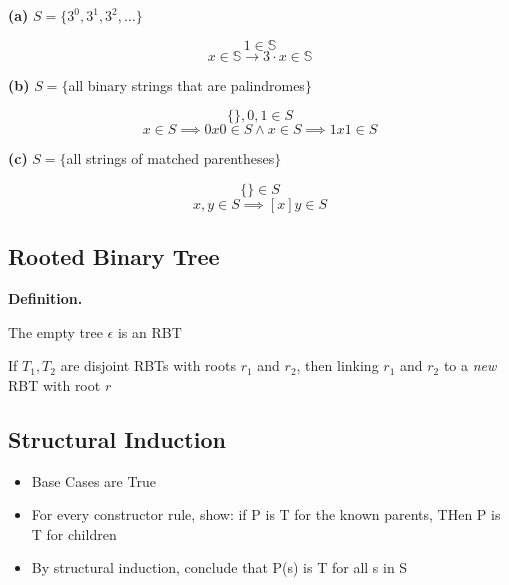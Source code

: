 \documentclass{article}
\begin{document}
\textbf{(a) } $S = \{3^0, 3^1, 3^2, \dots\}$

$$1 \in \mathbb{S}$$
$$x \in \mathbb{S} \rightarrow 3\cdot x \in \mathbb{S}$$

\textbf{(b) } $S = \{$all binary strings that are palindromes$\}$

$$\{\},0,1 \in S$$
$$x \in S \implies 0x0 \in S \wedge x \in S \implies 1x1 \in S$$

\textbf{(c) } $S = \{$all strings of matched parentheses$\}$ 

$$\{\} \in S$$ $$x,y \in S \implies [x]y \in S$$

\subsection*{Rooted Binary Tree}

\textbf{Definition.}

The empty tree $\epsilon$ is an RBT

If $T_1, T_2$ are disjoint RBTs with roots $r_1$ and $r_2$, then linking $r_1$ and $r_2$ to a \textit{new} RBT with root $r$

\subsection*{Structural Induction}

\begin{itemize}
  \item Base Cases are True
  \item For every constructor rule, show: if P is T for the known parents, THen P is T for children
  \item By structural induction, conclude that P(s) is T for all s in S
\end{itemize}
\end{document}
